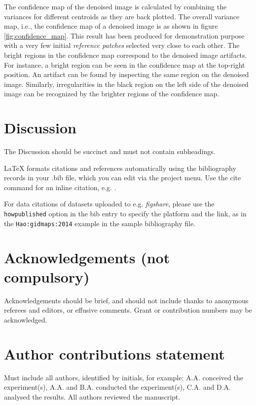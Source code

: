 \documentclass[fleqn,10pt]{wlscirep}
\begin{document}
The confidence map of the denoised image is calculated by combining the variances\cite{chan1982updating} for different centroids as they are back plotted. The overall variance map, i.e., the confidence map of a denoised image is as shown in figure \ref{fig:confidence_map}. This result has been produced for demonstration purpose with a very few initial \textit{reference patches} selected very close to each other. The bright regions in the confidence map correspond to the denoised image artifacts. For instance, a bright region can be seen in the confidence map at the top-right position. An artifact can be found by inspecting the same region on the denoised image. Similarly, irregularities in the black region on the left side of the denoised image can be recognized by the brighter regions of the confidence map.

\section*{Discussion}

The Discussion should be succinct and must not contain subheadings.
 



\noindent LaTeX formats citations and references automatically using the bibliography records in your .bib file, which you can edit via the project menu. Use the cite command for an inline citation, e.g.  \cite{Hao:gidmaps:2014}.

For data citations of datasets uploaded to e.g. \emph{figshare}, please use the \verb|howpublished| option in the bib entry to specify the platform and the link, as in the \verb|Hao:gidmaps:2014| example in the sample bibliography file.

\section*{Acknowledgements (not compulsory)}

Acknowledgements should be brief, and should not include thanks to anonymous referees and editors, or effusive comments. Grant or contribution numbers may be acknowledged.

\section*{Author contributions statement}

Must include all authors, identified by initials, for example:
A.A. conceived the experiment(s),  A.A. and B.A. conducted the experiment(s), C.A. and D.A. analysed the results.  All authors reviewed the manuscript. 
\end{document}
